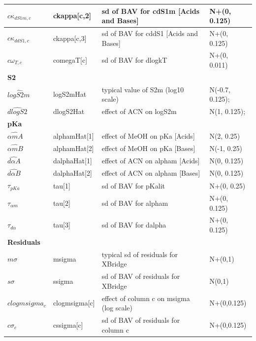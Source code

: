 \documentclass[
]{article}
\begin{document}
\begin{longtable}[t]{l|l|l|l}
\hline
\hspace{1em}$c\kappa_{dS1m,c}$ & ckappa[c,2] & sd of BAV for cdS1m [Acids and Bases] & N+(0, 0.125)\\
\hline
\hspace{1em}$c\kappa_{ddS1,c}$ & ckappa[c,3] & sd of BAV for cddS1 [Acids and Bases] & N+(0, 0.125)\\
\hline
\hspace{1em}$c\omega_{T,c}$ & comegaT[c] & sd of BAV for dlogkT & N+(0, 0.011)\\
\hline
\multicolumn{4}{l}{\textbf{S2}}\\
\hline
\hspace{1em}$\hat{logS2m}$ & logS2mHat & typical value of S2m (log10 scale) & N(-0.7, 0.125);\\
\hline
\hspace{1em}$\hat{dlogS2}$ & dlogS2Hat & effect of ACN on logS2m & N(1, 0.125);\\
\hline
\multicolumn{4}{l}{\textbf{pKa}}\\
\hline
\hspace{1em}$\hat{\alpha mA}$ & alphamHat[1] & effect of MeOH on pKa [Acids] & N(2, 0.25)\\
\hline
\hspace{1em}$\hat{\alpha mB}$ & alphamHat[2] & effect of MeOH on pKa [Bases] & N(-1, 0.25)\\
\hline
\hspace{1em}$\hat{d\alpha A}$ & dalphaHat[1] & effect of ACN on alpham [Acids] & N(0, 0.125)\\
\hline
\hspace{1em}$\hat{d\alpha B}$ & dalphaHat[2] & effect of ACN on alpham [Bases] & N(0, 0.125)\\
\hline
\hspace{1em}$\tau_{pKa}$ & tau[1] & sd of BAV for pKalit & N+(0, 0.25)\\
\hline
\hspace{1em}$\tau_{\alpha m}$ & tau[2] & sd of BAV for alpham & N+(0, 0.125)\\
\hline
\hspace{1em}$\tau_{d\alpha}$ & tau[3] & sd of BAV for dalpha & N+(0, 0.125)\\
\hline
\multicolumn{4}{l}{\textbf{Residuals}}\\
\hline
\hspace{1em}$m\sigma$ & msigma & typical sd of residuals for XBridge & N+(0,1)\\
\hline
\hspace{1em}$s\sigma$ & ssigma & sd of BAV of residuals for XBridge & N(0,1)\\
\hline
\hspace{1em}$clogmsigma_c$ & clogmsigma[c] & effect of column c on msigma (log scale) & N+(0,0.125)\\
\hline
\hspace{1em}$c\sigma_c$ & cssigma[c] & sd of BAV of residuals for column c & N+(0,0.125)\\
\hline
\end{longtable}
\end{document}
